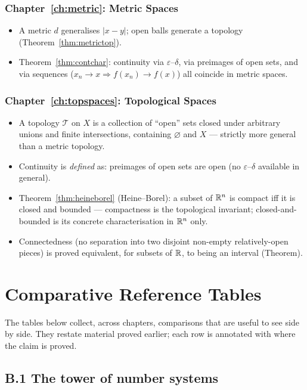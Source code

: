 \subsection*{Chapter~\ref{ch:metric}: Metric Spaces}
\begin{itemize}
	\item A metric $d$ generalises $|x-y|$; open balls generate a topology (Theorem~\ref{thm:metrictop}).
	\item Theorem~\ref{thm:contchar}: continuity via $\varepsilon$--$\delta$, via preimages of open sets, and via sequences ($x_n\to x\Rightarrow f(x_n)\to f(x)$) all coincide in metric spaces.
\end{itemize}

\subsection*{Chapter~\ref{ch:topspaces}: Topological Spaces}
\begin{itemize}
	\item A topology $\mathcal T$ on $X$ is a collection of ``open'' sets closed under arbitrary unions and finite intersections, containing $\varnothing$ and $X$ --- strictly more general than a metric topology.
	\item Continuity is \emph{defined} as: preimages of open sets are open (no $\varepsilon$--$\delta$ available in general).
	\item Theorem~\ref{thm:heineborel} (Heine--Borel): a subset of $\mathbb{R}^n$ is compact iff it is closed and bounded --- compactness is the topological invariant; closed-and-bounded is its concrete characterisation in $\mathbb{R}^n$ only.
	\item Connectedness (no separation into two disjoint non-empty relatively-open pieces) is proved equivalent, for subsets of $\mathbb{R}$, to being an interval (Theorem).
\end{itemize}

\chapter{Comparative Reference Tables}\label{ch:comparisons}

The tables below collect, across chapters, comparisons that are useful to see side by side. They restate material proved earlier; each row is annotated with where the claim is proved.

\section*{B.1 The tower of number systems}

